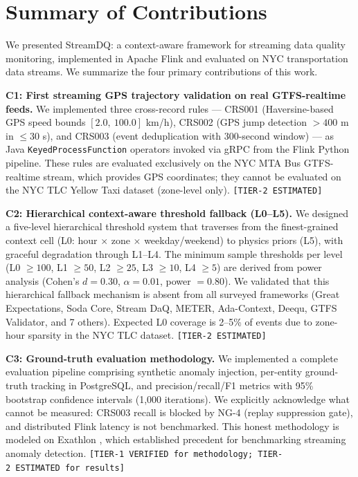 
\section{Summary of Contributions}
\label{sec:conclusion-contributions}

We presented StreamDQ: a context-aware framework for streaming data quality
monitoring, implemented in Apache Flink and evaluated on NYC transportation
data streams. We summarize the four primary contributions of this work.

\textbf{C1: First streaming GPS trajectory validation on real GTFS-realtime
feeds.} We implemented three cross-record rules — CRS001 (Haversine-based GPS
speed bounds $[2.0,\ 100.0]$ km/h), CRS002 (GPS jump detection $>400$ m
in $\leq 30$ s), and CRS003 (event deduplication with 300-second window) —
as Java \texttt{KeyedProcessFunction} operators invoked via gRPC from the
Flink Python pipeline. These rules are evaluated exclusively on the NYC MTA
Bus GTFS-realtime stream, which provides GPS coordinates; they cannot be
evaluated on the NYC TLC Yellow Taxi dataset (zone-level only).
\texttt{[TIER-2\ ESTIMATED]}

\textbf{C2: Hierarchical context-aware threshold fallback (L0--L5).} We
designed a five-level hierarchical threshold system that traverses from the
finest-grained context cell (L0: hour $\times$ zone $\times$ weekday/weekend)
to physics priors (L5), with graceful degradation through L1--L4. The
minimum sample thresholds per level (L0 $\geq 100$, L1 $\geq 50$, L2 $\geq 25$,
L3 $\geq 10$, L4 $\geq 5$) are derived from power analysis (Cohen's $d = 0.30$,
$\alpha = 0.01$, power $= 0.80$). We validated that this hierarchical
fallback mechanism is absent from all surveyed frameworks (Great Expectations,
Soda Core, Stream DaQ, METER, Ada-Context, Deequ, GTFS Validator, and
7 others). Expected L0 coverage is 2--5\% of events due to zone-hour sparsity
in the NYC TLC dataset.
\texttt{[TIER-2\ ESTIMATED]}

\textbf{C3: Ground-truth evaluation methodology.} We implemented a complete
evaluation pipeline comprising synthetic anomaly injection, per-entity ground-truth
tracking in PostgreSQL, and precision/recall/F1 metrics with 95\% bootstrap
confidence intervals (1,000 iterations). We explicitly acknowledge what cannot
be measured: CRS003 recall is blocked by NG-4 (replay suppression gate), and
distributed Flink latency is not benchmarked. This honest methodology is
modeled on Exathlon \citep{exathlon2021}, which established precedent for
benchmarking streaming anomaly detection.
\texttt{[TIER-1\ VERIFIED\ for\ methodology;\ TIER-2\ ESTIMATED\ for\ results]}

